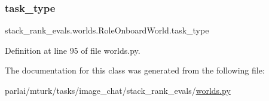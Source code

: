 \subsubsection{\texorpdfstring{task\+\_\+type}{task\_type}}
{\footnotesize\ttfamily stack\+\_\+rank\+\_\+evals.\+worlds.\+Role\+Onboard\+World.\+task\+\_\+type}



Definition at line 95 of file worlds.\+py.



The documentation for this class was generated from the following file\+:\begin{DoxyCompactItemize}
\item 
parlai/mturk/tasks/image\+\_\+chat/stack\+\_\+rank\+\_\+evals/\hyperlink{parlai_2mturk_2tasks_2image__chat_2stack__rank__evals_2worlds_8py}{worlds.\+py}\end{DoxyCompactItemize}
